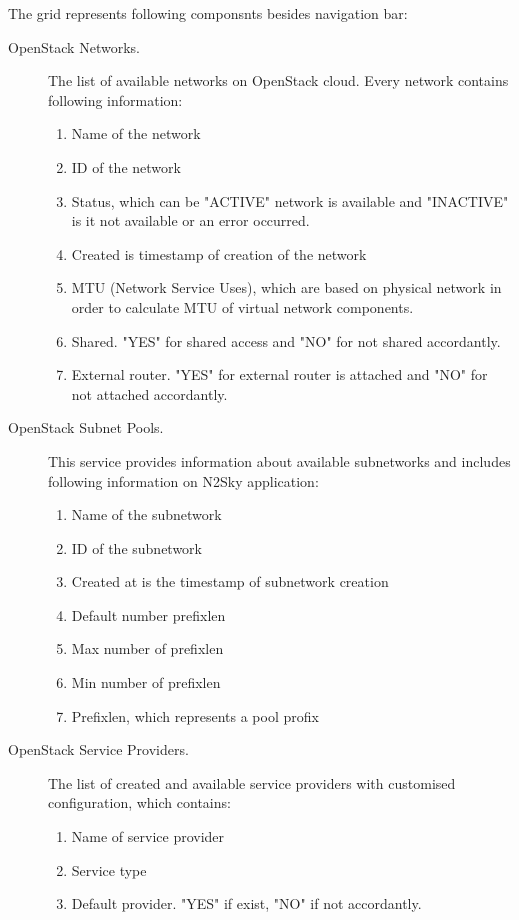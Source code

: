 The grid represents following componsnts besides navigation bar: 
\begin{description}
\item[OpenStack Networks.]  The list of available networks on OpenStack cloud. Every network contains following information:
\begin{enumerate}
\item Name of the network
\item ID of the network
\item Status, which can be "ACTIVE" network is available and "INACTIVE" is it not available or an error occurred. 
\item Created is timestamp of creation of the network
\item MTU (Network Service Uses), which are based on physical network in order to calculate MTU of virtual network components. 
\item Shared. "YES" for shared access and "NO" for not shared accordantly. 
\item External router. "YES" for external router is attached and "NO" for not attached accordantly. 
\end{enumerate}
\item[OpenStack Subnet Pools.] This service provides information about available subnetworks and includes following information on N2Sky application:
\begin{enumerate}
\item Name of the subnetwork
\item ID of the subnetwork
\item Created at is the timestamp of subnetwork creation
\item Default number prefixlen
\item Max number of prefixlen
\item Min number of prefixlen
\item Prefixlen, which represents a pool profix
\end{enumerate}
\item[OpenStack Service Providers.] The list of created and available service providers with customised configuration, which contains:
\begin{enumerate}
\item Name of service provider
\item Service type
\item Default provider. "YES" if exist, "NO" if not accordantly.  
\end{enumerate}

\end{description}


